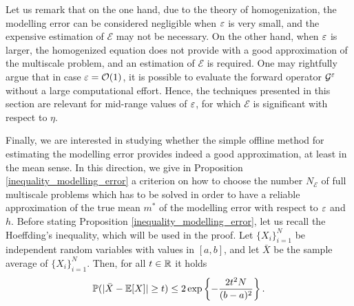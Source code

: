 \begin{remark}
\label{remark_modelling_error}
Let us remark that on the one hand, due to the theory of homogenization, the modelling error can be considered negligible when $\varepsilon$ is very small, and the expensive estimation of $\mathcal E$ may not be necessary. On the other hand, when $\varepsilon$ is larger, the homogenized equation does not provide with a good approximation of the multiscale problem, and an estimation of $\mathcal E$ is required. One may rightfully argue that in case $\varepsilon = \mathcal O(1)$, it is possible to evaluate the forward operator $\mathcal G^\varepsilon$ without a large computational effort. Hence, the techniques presented in this section are relevant for mid-range values of $\varepsilon$, for which $\mathcal E$ is significant with respect to $\eta$.
\end{remark}

Finally, we are interested in studying whether the simple offline method for estimating the modelling error provides indeed a good approximation, at least in the mean sense. In this direction, we give in Proposition \ref{inequality_modelling_error} a criterion on how to choose the number $N_{\mathcal{E}}$ of full multiscale problems which has to be solved in order to have a reliable approximation of the true mean $m^*$ of the modelling error with respect to $\varepsilon$ and $h$. Before stating Proposition \ref{inequality_modelling_error}, let us recall the Hoeffding's inequality, which will be used in the proof. Let $\{ X_i \}_{i=1}^N$ be independent random variables with values in $[a,b]$, and let $\bar{X}$ be the sample average of $\{X_i\}_{i=1}^N$. Then, for all $t \in \mathbb{R}$ it holds
\[ \mathbb{P} (\lvert\bar{X} - \mathbb{E}[X]\rvert \ge t) \le 2 \exp \left \{ - \frac{2 t^2 N}{(b-a)^2} \right \}. \]

